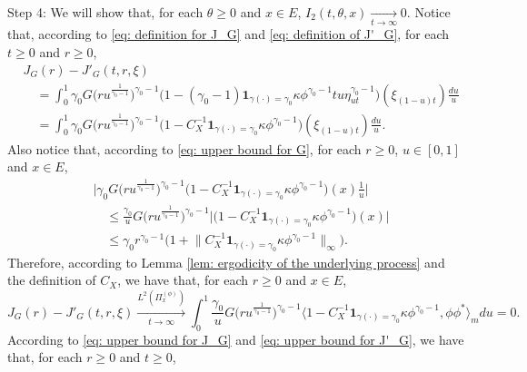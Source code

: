 \documentclass[12pt, a4paper]{amsart}
\theoremstyle{definition}
\numberwithin{equation}{section}
\begin{document}
	Step 4: We will show that, for each $\theta \geq 0$ and $x\in E$, $I_2(t,\theta,x) \xrightarrow[t\to \infty]{} 0$.
	Notice that, according to \eqref{eq: definition for J_G} and \eqref{eq: definition of J'_G}, for each $t\geq 0$ and $r\geq 0$,
\begin{equation}\begin{split}
	&J_G(r) - J'_G(t,r,\xi)
	\\&\quad = \int_0^1 \gamma_0 G\big( ru^{\frac{1}{\gamma_0 - 1}} \big) ^{\gamma_0 - 1} \big( 1- (\gamma_0 - 1) \mathbf 1_{\gamma(\cdot) = \gamma_0} \kappa \phi^{\gamma_0 - 1} tu\eta_{ut}^{\gamma_0 - 1} \big)(\xi_{(1-u)t}) \frac{du}{u}
	\\&\quad = \int_0^1 \gamma_0 G\big( ru^{\frac{1}{\gamma_0 - 1}} \big) ^{\gamma_0 - 1} \big( 1- C_X^{-1}\mathbf 1_{\gamma(\cdot) = \gamma_0} \kappa \phi^{\gamma_0 - 1} \big)(\xi_{(1-u)t}) \frac{du}{u}.
\end{split}\end{equation}
	Also notice that,
	according to \eqref{eq: upper bound for G}, for each $r \geq 0$, $u\in [0,1]$ and $x\in E$,
\begin{equation}\begin{split}
	&\big| \gamma_0 G\big( ru^{\frac{1}{\gamma_0 - 1}} \big) ^{\gamma_0 - 1} \big( 1- C_X^{-1}\mathbf 1_{\gamma(\cdot) = \gamma_0} \kappa \phi^{\gamma_0 - 1} \big)(x) \frac{1}{u} \big|
	\\&\quad \leq \frac{\gamma_0}{u} G\big( ru^{\frac{1}{\gamma_0 - 1}} \big) ^{\gamma_0 - 1} \big|\big( 1- C_X^{-1}\mathbf 1_{\gamma(\cdot) = \gamma_0} \kappa \phi^{\gamma_0 - 1} \big)(x) \big|
	\\&\quad \leq \gamma_0r^{\gamma_0 - 1} \big( 1+ \big\|C_X^{-1}\mathbf 1_{\gamma(\cdot) = \gamma_0} \kappa \phi^{\gamma_0 - 1} \big\|_\infty \big).
\end{split} \end{equation}
	Therefore, according to Lemma \ref{lem: ergodicity of the underlying process} and the definition of $C_X$, we have that, for each $r\geq 0$ and $x\in E$,
\begin{equation}
	J_G(r) - J'_G(t,r,\xi)
	\xrightarrow[t\to \infty]{L^2(\Pi_x^{(\phi)})}
	\int_0^1 \frac{\gamma_0}{u} G\big( ru^{\frac{1}{\gamma_0 - 1}} \big) ^{\gamma_0 - 1} \big\langle 1- C_X^{-1}\mathbf 1_{\gamma(\cdot) = \gamma_0} \kappa \phi^{\gamma_0 - 1}, \phi\phi^*\big\rangle_m du
	=0.
\end{equation}
	According to \eqref{eq: upper bound for J_G} and \eqref{eq: upper bound for J'_G}, we have that, for each $r\geq 0$ and $t\geq 0$,
\end{document}
